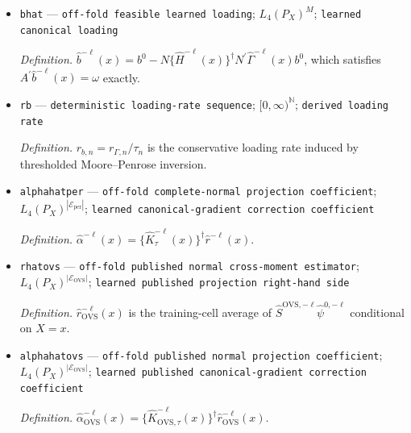 \documentclass{article}
\begin{document}
\begin{itemize}
  \par\smallskip\noindent\emph{Definition.} Let \(\widehat H_{\mathrm{raw}}^{-\ell}(x)=N^{\prime}\widehat\Gamma^{-\ell}(x)N\). The foldwise rank selector is \(\widehat r^{-\ell}(x)=\#\{j:\lambda_j(\widehat H_{\mathrm{raw}}^{-\ell}(x))>\tau_n\}\), and \(\widehat H^{-\ell}(x)\) retains exactly those eigencomponents, with Moore--Penrose inverse formed from the retained eigenvalues; the zero-rank convention applies when no eigenvalue exceeds \(\tau_n\).
  \item \texttt{bhat} --- \texttt{off-\allowbreak{}fold feasible learned loading}; \(L_4(P_X)^M\); \texttt{learned canonical loading}
  \par\smallskip\noindent\emph{Definition.} \(\widehat b^{-\ell}(x)=b^0-N\{\widehat H^{-\ell}(x)\}^{\dagger}N^{\prime}\widehat\Gamma^{-\ell}(x)b^0\), which satisfies \(A^{\prime}\widehat b^{-\ell}(x)=\omega\) exactly.
  \item \texttt{rb} --- \texttt{deterministic loading-\allowbreak{}rate sequence}; \([0,\infty)^{\mathbb N}\); \texttt{derived loading rate}
  \par\smallskip\noindent\emph{Definition.} \(r_{b,n}=r_{\Gamma,n}/\tau_n\) is the conservative loading rate induced by thresholded Moore--Penrose inversion.
  \item \texttt{alphahatper} --- \texttt{off-\allowbreak{}fold complete-\allowbreak{}normal projection coefficient}; \(L_4(P_X)^{|\mathcal E_{\mathrm{per}}|}\); \texttt{learned canonical-\allowbreak{}gradient correction coefficient}
  \par\smallskip\noindent\emph{Definition.} \(\widehat\alpha^{-\ell}(x)=\{\widehat K^{-\ell}_\tau(x)\}^{\dagger}\widehat r^{-\ell}(x)\).
  \item \texttt{rhatovs} --- \texttt{off-\allowbreak{}fold published normal cross-\allowbreak{}moment estimator}; \(L_4(P_X)^{|\mathcal E_{\mathrm{OVS}}|}\); \texttt{learned published projection right-\allowbreak{}hand side}
  \par\smallskip\noindent\emph{Definition.} \(\widehat r_{\mathrm{OVS}}^{-\ell}(x)\) is the training-cell average of \(\widehat S^{\mathrm{OVS},-\ell}\widehat\psi^{0,-\ell}\) conditional on \(X=x\).
  \item \texttt{alphahatovs} --- \texttt{off-\allowbreak{}fold published normal projection coefficient}; \(L_4(P_X)^{|\mathcal E_{\mathrm{OVS}}|}\); \texttt{learned published canonical-\allowbreak{}gradient correction coefficient}
  \par\smallskip\noindent\emph{Definition.} \(\widehat\alpha_{\mathrm{OVS}}^{-\ell}(x)=\{\widehat K_{\mathrm{OVS},\tau}^{-\ell}(x)\}^{\dagger}\widehat r_{\mathrm{OVS}}^{-\ell}(x)\).

\end{itemize}
\end{document}
